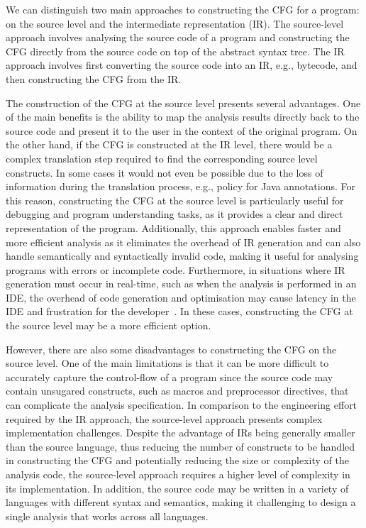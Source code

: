 We can distinguish two main approaches to constructing the CFG for a program:
on the source level and the intermediate representation (IR). The source-level approach
involves analysing the source code of a program and constructing the CFG
directly from the source code on top of the abstract syntax tree. The IR approach involves
first converting the source code into an IR, e.g., bytecode,
and then constructing the CFG from the IR.%

The construction of the CFG at the source level presents several advantages. One of the
main benefits is the ability to map the analysis results directly back to the source code
and present it to the user in the context of the original program. On the other hand,
if the CFG is constructed at the IR level, there would be a complex translation step
required to find the corresponding source level constructs. In some cases it would
not even be possible due to the loss of information during the translation process, e.g.,
 policy for Java annotations.
For this reason, constructing the CFG at the source level is particularly useful for
debugging and program understanding tasks, as it provides a clear and direct
representation of the program. Additionally, this approach enables faster and
more efficient analysis as it eliminates the overhead of IR generation and can
also handle semantically and syntactically invalid code, making it useful for
analysing programs with errors or incomplete code. Furthermore, in situations where
IR generation must occur in real-time, such as when the analysis is performed in an
IDE, the overhead of code generation and optimisation may cause latency in the IDE and frustration for the developer~\cite{piskachev2022far}.
In these cases, constructing the CFG at the source level may be a more efficient option.

However, there are also some disadvantages to constructing the CFG on the source level.
One of the main limitations is that it can be more difficult to accurately capture the
control-flow of a program since the source code may contain unsugared constructs,
such as macros and preprocessor directives, that
can complicate the analysis specification.
In comparison to the engineering effort required by the IR approach, the source-level
approach presents complex implementation challenges. Despite the advantage
of IRs being generally smaller than the source language, thus reducing the number
of constructs to be handled in constructing the CFG and potentially reducing
the size or complexity of the analysis code, the source-level approach requires
a higher level of complexity in its implementation.
In addition, the source code may be written in a variety
of languages with different syntax and semantics, making it challenging to
design a single analysis that works across all languages.

